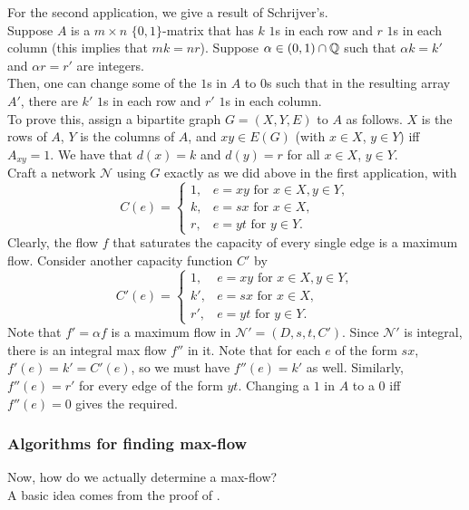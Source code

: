 			For the second application, we give a result of Schrijver's.\\
			Suppose $A$ is a $m\times n$ $\{0,1\}$-matrix that has $k$ $1$s in each row and $r$ $1$s in each column (this implies that $mk=nr$). Suppose $\alpha \in (0,1) \cap \mathbb{Q}$ such that $\alpha k = k'$ and $\alpha r = r'$ are integers.\\
			Then, one can change some of the $1$s in $A$ to $0$s such that in the resulting array $A'$, there are $k'$ $1$s in each row and $r'$ $1$s in each column.\\
			To prove this, assign a bipartite graph $G = (X,Y,E)$ to $A$ as follows. $X$ is the rows of $A$, $Y$ is the columns of $A$, and $xy\in E(G)$ (with $x\in X$, $y\in Y$) iff $A_{xy} = 1$. We have that $d(x) = k$ and $d(y) = r$ for all $x\in X$, $y\in Y$.\\
			Craft a network $\mathcal{N}$ using $G$ exactly as we did above in the first application, with
			\[
				C(e) = 
				\begin{cases}
					1, & e = xy\text{ for }x\in X, y\in Y, \\
					k, & e = sx\text{ for }x\in X, \\
					r, & e = yt\text{ for }y\in Y.
				\end{cases}
			\]
			Clearly, the flow $f$ that saturates the capacity of every single edge is a maximum flow. Consider another capacity function $C'$ by
			\[
				C'(e) = 
				\begin{cases}
					1, & e = xy\text{ for }x\in X, y\in Y, \\
					k', & e = sx\text{ for }x\in X, \\
					r', & e = yt\text{ for }y\in Y.
				\end{cases}	
			\]
			Note that $f' = \alpha f$ is a maximum flow in $\mathcal{N}' = (D,s,t,C')$. Since $\mathcal{N}'$ is integral, there is an integral max flow $f''$ in it. Note that for each $e$ of the form $sx$, $f'(e) = k' = C'(e)$, so we must have $f''(e) = k'$ as well. Similarly, $f''(e) = r'$ for every edge of the form $yt$. Changing a $1$ in $A$ to a $0$ iff $f''(e) = 0$ gives the required.

		\subsubsection{Algorithms for finding max-flow}

			Now, how do we actually determine a max-flow?\\
			A basic idea comes from the proof of .

